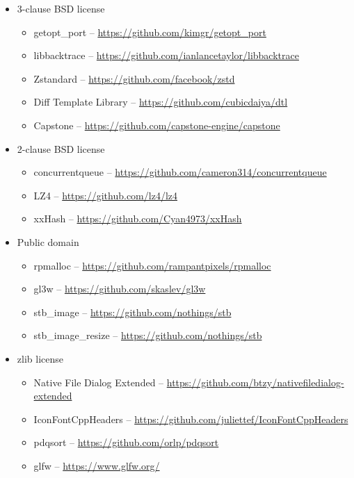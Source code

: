 \documentclass[hidelinks,titlepage,a4paper,twoside]{article}
\begin{document}
\begin{itemize}
\item 3-clause BSD license
\begin{itemize}
\item getopt\_port -- \url{https://github.com/kimgr/getopt\_port}
\item libbacktrace \faStar{} -- \url{https://github.com/ianlancetaylor/libbacktrace}
\item Zstandard -- \url{https://github.com/facebook/zstd}
\item Diff Template Library -- \url{https://github.com/cubicdaiya/dtl}
\item Capstone -- \url{https://github.com/capstone-engine/capstone}
\end{itemize}

\item 2-clause BSD license
\begin{itemize}
\item concurrentqueue \faStar{} -- \url{https://github.com/cameron314/concurrentqueue}
\item LZ4 \faStar{} -- \url{https://github.com/lz4/lz4}
\item xxHash -- \url{https://github.com/Cyan4973/xxHash}
\end{itemize}

\item Public domain
\begin{itemize}
\item rpmalloc \faStar{} -- \url{https://github.com/rampantpixels/rpmalloc}
\item gl3w -- \url{https://github.com/skaslev/gl3w}
\item stb\_image -- \url{https://github.com/nothings/stb}
\item stb\_image\_resize -- \url{https://github.com/nothings/stb}
\end{itemize}

\item zlib license
\begin{itemize}
\item Native File Dialog Extended -- \url{https://github.com/btzy/nativefiledialog-extended}
\item IconFontCppHeaders -- \url{https://github.com/juliettef/IconFontCppHeaders}
\item pdqsort -- \url{https://github.com/orlp/pdqsort}
\item glfw -- \url{https://www.glfw.org/}
\end{itemize}


\end{itemize}
\end{document}

